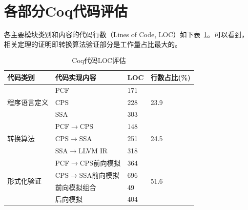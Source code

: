 \section{各部分Coq代码评估}

各主要模块类别和内容的代码行数（Lines of Code, LOC）如下表~\ref{tabeval}。可以看到，相关定理的证明即转换算法验证部分是工作量占比最大的。

\begin{table}
    \linespread{1.25}
    \small
    \centering
    \caption{Coq代码LOC评估}\label{tabeval}
    \begin{center}
    \begin{tabular}{|l|l|l|l|}
    \hline
    代码类别 & 代码实现内容 & LOC & 行数占比(\%) \\
    \hline
    \multirow{3}{*}{程序语言定义} & PCF & 171 & \multirow{3}{*}{23.9} \\
        & CPS & 228 & \\
        & SSA & 303 & \\
        \hline
    \multirow{3}{*}{转换算法} & PCF$\rightarrow$CPS & 148 & \multirow{3}{*}{24.5} \\
        & CPS$\rightarrow$SSA & 251 & \\
        & SSA$\rightarrow$LLVM IR & 318 & \\
        \hline
    \multirow{4}{*}{形式化验证} & PCF$\rightarrow$CPS前向模拟 & 364 & \multirow{4}{*}{51.6} \\
        & CPS$\rightarrow$SSA前向模拟 & 696 & \\
        & 前向模拟组合 & 49 & \\
        & 后向模拟 & 404 & \\
        \hline
    \end{tabular}
    \end{center}
\end{table}

